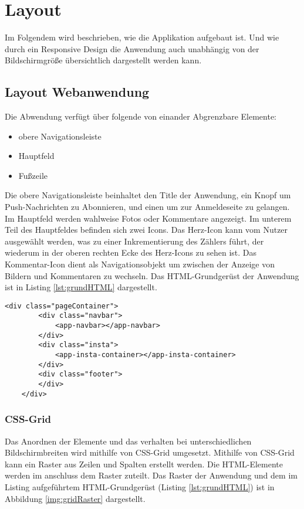 \chapter{Layout}

Im Folgendem wird beschrieben, wie die Applikation aufgebaut ist. Und wie durch ein Responsive Design die Anwendung auch unabhängig von der Bildschirmgröße übersichtlich dargestellt werden kann. 

\section{Layout Webanwendung}
Die Abwendung verfügt über folgende von einander Abgrenzbare Elemente: 
\begin{itemize}
    \item obere Navigationsleiste
    \item Hauptfeld
    \item Fußzeile
\end{itemize}

Die obere Navigationsleiste beinhaltet den Title der Anwendung, ein Knopf um Push-Nachrichten zu Abonnieren, und einen um zur Anmeldeseite zu gelangen. Im Hauptfeld werden wahlweise Fotos oder Kommentare angezeigt. Im unterem Teil des Hauptfeldes befinden sich zwei Icons. Das Herz-Icon kann vom Nutzer ausgewählt werden, was zu einer Inkrementierung des Zählers führt, der wiederum in der oberen rechten Ecke des Herz-Icons zu sehen ist. Das Kommentar-Icon dient als Navigationsobjekt um zwischen der Anzeige von Bildern und Kommentaren zu wechseln. Das HTML-Grundgerüst der Anwendung ist in Listing \ref{lst:grundHTML} dargestellt. 

\begin{lstlisting}[caption={HTML-Grundgerüst der Webanwendung}, label=lst:grundHTML]
    <div class="pageContainer">
        <div class="navbar">
            <app-navbar></app-navbar>
        </div>
        <div class="insta">
            <app-insta-container></app-insta-container>
        </div>
        <div class="footer">
        </div>
    </div>
\end{lstlisting}

\subsection{CSS-Grid}

Das Anordnen der Elemente und das verhalten bei unterschiedlichen Bildschirmbreiten wird mithilfe von CSS-Grid umgesetzt. 
Mithilfe von CSS-Grid kann ein Raster aus Zeilen und Spalten erstellt werden. Die HTML-Elemente werden im anschluss dem Raster zuteilt. 
Das Raster der Anwendung und dem im Listing aufgeführtem HTML-Grundgerüst (Listing \ref{lst:grundHTML}) ist in Abbildung \ref{img:gridRaster} dargestellt.

